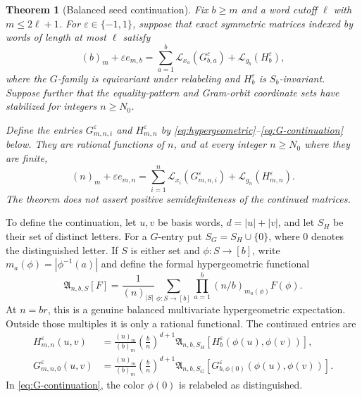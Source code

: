 \documentclass[11pt]{article}
\newtheorem{theorem}{Theorem}[section]
\newcommand{\Lcal}{\mathcal L}
\newcommand{\fall}[2]{(#1)_{#2}}
\begin{document}
\begin{theorem}[Balanced seed continuation]\label{thm:balanced-continuation}
Fix \(b\ge m\) and a word cutoff \(\ell\) with \(m\le2\ell+1\).
For \(\varepsilon\in\{-1,1\}\), suppose that exact symmetric matrices indexed
by words of length at most \(\ell\) satisfy
\begin{equation}\label{eq:general-seed}
 \fall bm+\varepsilon e_{m,b}
 =
 \sum_{a=1}^{b}\Lcal_{x_a}(G_{b,a}^{\varepsilon})
 +\Lcal_{g_b}(H_b^{\varepsilon}),
\end{equation}
where the \(G\)-family is equivariant under relabeling and \(H_b^\varepsilon\)
is \(S_b\)-invariant.  Suppose further that the equality-pattern and
Gram-orbit coordinate sets have stabilized for integers \(n\ge N_0\).

Define the entries \(G_{m,n,i}^{\varepsilon}\) and
\(H_{m,n}^{\varepsilon}\) by
\eqref{eq:hypergeometric}--\eqref{eq:G-continuation} below.  They are rational
functions of \(n\), and at every integer \(n\ge N_0\) where they are finite,
\begin{equation}\label{eq:general-continuation}
 \fall nm+\varepsilon e_{m,n}
 =
 \sum_{i=1}^{n}\Lcal_{x_i}(G_{m,n,i}^{\varepsilon})
 +\Lcal_{g_n}(H_{m,n}^{\varepsilon}).
\end{equation}
The theorem does not assert positive semidefiniteness of the continued
matrices.
\end{theorem}

To define the continuation, let \(u,v\) be basis words,
\(d=|u|+|v|\), and let \(S_H\) be their set of distinct letters.  For a
\(G\)-entry put \(S_G=S_H\cup\{0\}\), where \(0\) denotes the distinguished
letter.  If \(S\) is either set and \(\phi:S\to[b]\), write
\(m_a(\phi)=|\phi^{-1}(a)|\) and define the formal hypergeometric functional
\begin{equation}\label{eq:hypergeometric}
 \mathfrak A_{n,b,S}[F]
 =
 \frac1{\fall n{|S|}}
 \sum_{\phi:S\to[b]}
 \prod_{a=1}^b\fall{n/b}{m_a(\phi)}F(\phi).
\end{equation}
At \(n=br\), this is a genuine balanced multivariate hypergeometric
expectation.  Outside those multiples it is only a rational functional.  The
continued entries are
\begin{align}
 H_{m,n}^{\varepsilon}(u,v)
 &=
 \frac{\fall nm}{\fall bm}
 \left(\frac bn\right)^{d+1}
 \mathfrak A_{n,b,S_H}
 \!\left[H_b^{\varepsilon}(\phi(u),\phi(v))\right],
 \label{eq:H-continuation}\\
 G_{m,n,0}^{\varepsilon}(u,v)
 &=
 \frac{\fall nm}{\fall bm}
 \left(\frac bn\right)^{d+1}
 \mathfrak A_{n,b,S_G}
 \!\left[
 G_{b,\phi(0)}^{\varepsilon}(\phi(u),\phi(v))
 \right].
 \label{eq:G-continuation}
\end{align}
In \eqref{eq:G-continuation}, the color \(\phi(0)\) is relabeled as distinguished.
\end{document}
